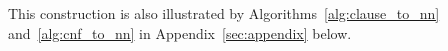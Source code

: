 \documentclass{amsart}[11pt]
\newcommand{\layersep}{2.5cm}
\numberwithin{equation}{section}
\numberwithin{theorem}{section}
\begin{document}
This construction is also illustrated by Algorithms~\ref{alg:clause_to_nn} and~\ref{alg:cnf_to_nn} in Appendix~\ref{sec:appendix} below.










\end{document}
